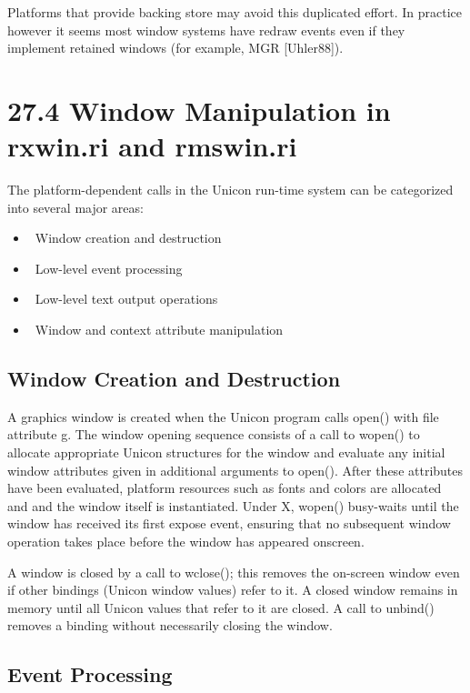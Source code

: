 Platforms that provide backing store may avoid this duplicated
effort. In practice however it seems most window systems have redraw
events even if they implement retained windows (for example, MGR
[Uhler88]).

\section[27.4 Window Manipulation in rxwin.ri and rmswin.ri]{27.4 Window Manipulation in rxwin.ri and rmswin.ri}

The platform-dependent calls in the Unicon run-time system can be
categorized into several major areas:

\liststyleLxlv
\begin{itemize}
\item 
\ Window creation and destruction
\item 
\ Low-level event processing
\item 
\ Low-level text output operations
\item 
\ Window and context attribute manipulation
\end{itemize}

\subsection{Window Creation and Destruction}

A graphics window is created when the Unicon program calls
\textsf{open()} with file attribute
\textsf{{\textquotedbl}g{\textquotedbl}}. The window opening sequence
consists of a call to \textsf{wopen()} to allocate appropriate Unicon
structures for the window and evaluate any initial window attributes
given in additional arguments to \textsf{open()}. After these
attributes have been evaluated, platform resources such as fonts and
colors are allocated and and the window itself is instantiated. Under
X, \textsf{wopen()} busy-waits until the window has received its first
expose event, ensuring that no subsequent window operation takes place
before the window has appeared onscreen.

A window is closed by a call to \textsf{wclose()}; this removes the
on-screen window even if other bindings (Unicon window values) refer
to it. A closed window remains in memory until all Unicon values that
refer to it are closed. A call to \textsf{unbind()} removes a binding
without necessarily closing the window.

\subsection{Event Processing}

